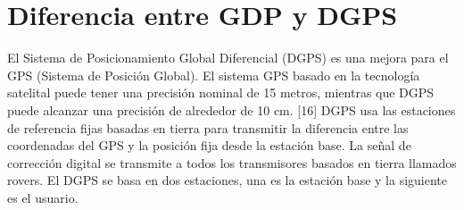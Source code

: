 \section{Diferencia entre GDP y DGPS}
El Sistema de Posicionamiento Global Diferencial (DGPS) es una mejora para el GPS (Sistema de Posición Global). El sistema GPS basado en la tecnología satelital puede tener una precisión nominal de 15 metros, mientras que DGPS puede alcanzar una precisión de alrededor de 10 cm. [16] DGPS usa las estaciones de referencia fijas basadas en tierra para transmitir la diferencia entre las coordenadas del GPS y la posición fija desde la estación base. La señal de corrección digital se transmite a todos los transmisores basados en tierra llamados rovers. El DGPS se basa en dos estaciones, una es la estación base y la siguiente es el usuario. 

